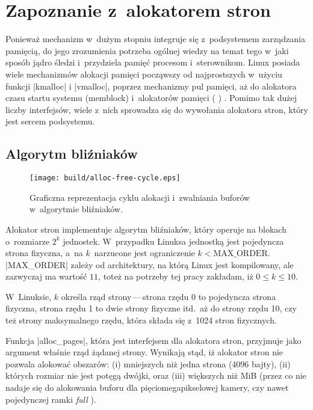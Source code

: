 \section{Zapoznanie z~alokatorem stron}

Ponieważ mechanizm  w~dużym stopniu integruje się z~podsystemem
zarządzania pamięcią, do jego zrozumienia potrzeba ogólnej wiedzy na
temat tego w~jaki sposób jądro śledzi i~przydziela pamięć procesom
i~sterownikom.  Linux posiada wiele mechanizmów alokacji pamięci
począwszy od najprostszych w~użyciu funkcji \code|kmalloc|
i \code|vmalloc|, poprzez mechanizmy pul pamięci, aż do alokatora
czasu startu systemu (memblock) i~alokatorów pamięci  ( )
\autocite[rozdział 8]{bib:ldd3}.  Pomimo tak dużej liczby interfejsów,
wiele z~nich sprowadza się do wywołania alokatora stron, który jest
sercem podsystemu.

\subsection{Algorytm bliźniaków}

\begin{wrapfigure}{o}[1.5cm]{0.3\textwidth}
\begin{center}
\texttt{[image: build/alloc-free-cycle.eps]}
\end{center}
\caption[Zarządzanie pamięcią w~algorytmie bliźniaków]{Graficzna
  reprezentacja cyklu alokacji i~zwalniania buforów w~algorytmie
  bliźniaków.}
\end{wrapfigure}

Alokator stron implementuje algorytm bliźniaków, który operuje na
blokach o~rozmiarze $2^k$ jednostek.  W~przypadku Linuksa jednostką
jest pojedyncza strona fizyczna, a~na $k$~narzucone jest ograniczenie
$k < \mathrm{MAX\_ORDER}$.  \code|MAX_ORDER| zależy od architektury,
na którą Linux jest kompilowany, ale zazwyczaj ma wartość $11$, toteż
na potrzeby tej pracy zakładam, iż $0 \le k \le 10$.

W~Linuksie, $k$ określa rząd strony\,---\,strona rzędu 0 to pojedyncza
strona fizyczna, strona rzędu 1 to dwie strony fizyczne itd.\ aż do
strony rzędu 10, czy też strony maksymalnego rzędu, która składa się
z~1024 stron fizycznych.

Funkcja \code|alloc_pages|, która jest interfejsem dla alokatora
stron, przyjmuje jako argument właśnie rząd żądanej strony.  Wynikają
stąd, iż alokator stron nie pozwala alokować obszarów: (i) mniejszych
niż jedna strona (4096 bajty), (ii) których rozmiar nie jest potęgą
dwójki, oraz (iii) większych niż \unit[4]{MiB} (przez co nie nadaje
się do alokowania buforu dla pięciomegapikselowej kamery, czy nawet
pojedynczej ramki \textit{full }).


